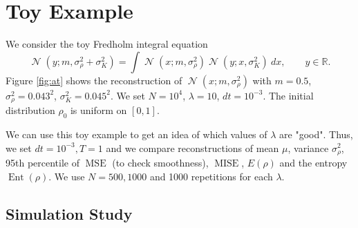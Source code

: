 \documentclass[a4paper]{article}
\theoremstyle{definition}
\DeclareMathOperator{\N}{\mathcal{N}}
\DeclareMathOperator{\mise}{MISE}
\DeclareMathOperator{\mse}{MSE}
\DeclareMathOperator{\ent}{Ent}
\begin{document}
\section{Toy Example}

We consider the toy Fredholm integral equation
\begin{equation*}
\N(y; m, \sigma_{\rho}^2 + \sigma_K^2) = \int \N(x; m, \sigma_{\rho}^2)\N(y; x, \sigma_K^2)\ dx,\qquad y\in\mathbb{R}.
\end{equation*}
Figure \ref{fig:at} shows the reconstruction of $\N(x; m, \sigma_{\rho}^2)$ with $m=0.5$, $\sigma_{\rho}^2 = 0.043^2$, $\sigma_K^2 = 0.045^2$.
We set $N=10^{4}$, $\lambda = 10$, $dt = 10^{-3}$. The initial distribution $\rho_0$ is uniform on $[0, 1]$.


We can use this toy example to get an idea of which values of $\lambda$ are "good".
Thus, we set $dt=10^{-3}, T=1$ and we compare reconstructions of mean $\mu$, variance $\sigma_\rho^2$, 95th percentile of $\mse$ (to check smoothness), $\mise$, $E(\rho)$ and the entropy $\ent(\rho)$. We use $N=500, 1000$ and 1000 repetitions for each $\lambda$.


\subsection{Simulation Study}
\end{document}
